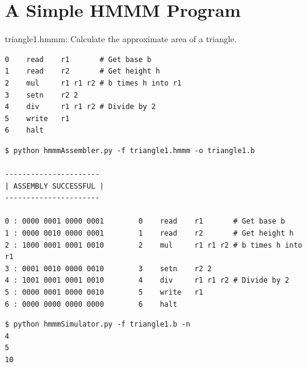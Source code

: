 \documentclass[8pt,a4paper,compress]{beamer}
\begin{document}
\section{A Simple HMMM Program}

\begin{frame}[fragile]
\pause

\begin{framed}
\tiny triangle1.hmmm: Calculate the approximate area of a triangle.
\end{framed}

\begin{lstlisting}[language={}]
0    read    r1       # Get base b
1    read    r2       # Get height h
2    mul     r1 r1 r2 # b times h into r1
3    setn    r2 2
4    div     r1 r1 r2 # Divide by 2
5    write   r1
6    halt
\end{lstlisting}

\pause

\begin{lstlisting}[language={}]
$ python hmmmAssembler.py -f triangle1.hmmm -o triangle1.b

----------------------
| ASSEMBLY SUCCESSFUL |
----------------------

0 : 0000 0001 0000 0001        0    read    r1       # Get base b
1 : 0000 0010 0000 0001        1    read    r2       # Get height h
2 : 1000 0001 0001 0010        2    mul     r1 r1 r2 # b times h into r1
3 : 0001 0010 0000 0010        3    setn    r2 2
4 : 1001 0001 0001 0010        4    div     r1 r1 r2 # Divide by 2
5 : 0000 0001 0000 0010        5    write   r1
6 : 0000 0000 0000 0000        6    halt
\end{lstlisting}

\pause

\begin{lstlisting}[language={}]
$ python hmmmSimulator.py -f triangle1.b -n
4
5
10
\end{lstlisting}
\end{frame}
\end{document}
